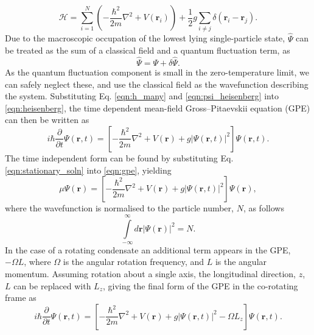 \begin{equation}\label{eqn:h_many}
\mathcal{H} = \displaystyle\sum\limits_{i=1}^N \left( -\frac{\hbar^2}{2m}\nabla^2  + V(\textbf{r}_i)\right) + \frac{1}{2}g\displaystyle\sum\limits_{i\neq j}\delta(\textbf{r}_i - \textbf{r}_j).
\end{equation}
Due to the macroscopic occupation of the lowest lying single-particle state, $\hat{\Psi}$ can be treated as the sum of a classical field and a quantum fluctuation term, as
\begin{equation}\label{eqn:gpe_fluc}
    \hat{\Psi} = \Psi + \delta\hat{\Psi}.
\end{equation}
As the quantum fluctuation component is small in the zero-temperature limit, we can safely neglect these, and use the classical field as the wavefunction describing the system. Substituting Eq. \eqref{eqn:h_many} and \eqref{eqn:psi_heisenberg} into \eqref{eqn:heisenberg}, the time dependent mean-field Gross--Pitaevskii equation (GPE) can then be written as
\begin{equation}\label{eqn:gpe}
i\hbar\frac{\partial}{\partial t}\Psi(\textbf{r},t) = \left[-\frac{\hbar^2}{2m}\nabla^2 + V(\textbf{r}) + g\vert\Psi(\textbf{r},t)\vert^2 \right]\Psi(\textbf{r},t).
\end{equation}
The time independent form can be found by substituting Eq. \eqref{eqn:stationary_soln} into \eqref{eqn:gpe}, yielding
\begin{equation}
\mu\Psi(\textbf{r}) = \left[-\frac{\hbar^2}{2m}\nabla^2 + V(\textbf{r}) + g\vert\Psi(\textbf{r},t)\vert^2 \right]\Psi(\textbf{r}),
\end{equation}
where the wavefunction is normalised to the particle number, $N$, as follows
\begin{equation}\label{eqn:norm}
\displaystyle\int\limits_{-\infty}^{\infty}d\textbf{r} \left\vert \Psi\left(\textbf{r}\right) \right\vert^2 = N.
\end{equation}
In the case of a rotating condensate an additional term appears in the GPE, $-\Omega L$, where $\Omega$ is the angular rotation frequency, and $L$ is the angular momentum. Assuming rotation about a single axis, the longitudinal direction, $z$, $L$ can be replaced with $L_z$, giving the final form of the GPE in the co-rotating frame as
\begin{equation}\label{eqn:gpe_rotation}
i\hbar\frac{\partial}{\partial t}\Psi(\textbf{r},t) = \left[-\frac{\hbar^2}{2m}\nabla^2 + V(\textbf{r}) + g\vert\Psi(\textbf{r},t)\vert^2 - \Omega L_z  \right]\Psi(\textbf{r},t).
\end{equation}

